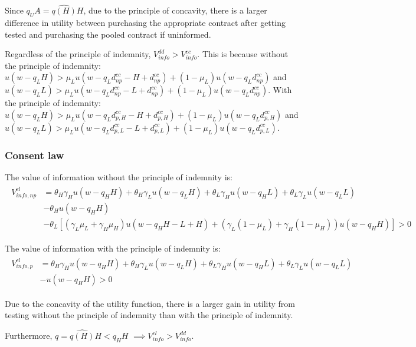 \documentclass[natbib=false,preprint,12pt]{elsarticle}
\theoremstyle{plain}
\theoremstyle{definition}
\theoremstyle{plain}
\theoremstyle{TheoremNum}
\theoremstyle{CorollaryNum}
\theoremstyle{PropositionNum}
\theoremstyle{TheoremNum}
\begin{document}
Since $q_U A = \widehat{q(H)}H$, due to the principle of concavity, there is a larger difference in utility between purchasing the appropriate contract after getting tested and purchasing the pooled contract if uninformed.

Regardless of the principle of indemnity, $V_{info}^{dd} > V_{info}^{cc}$. This is because without the principle of indemnity: $u(w-q_L H) > \mu_L u(w-q_L d_{np}^{cc} - H + d_{np}^{cc}) + (1-\mu_L)u(w-q_L d_{np}^{cc})$ and $u(w-q_L L) > \mu_L u(w-q_L d_{np}^{cc} - L + d_{np}^{cc}) + (1-\mu_L)u(w-q_L d_{np}^{cc})$. With the principle of indemnity: $u(w-q_L H) > \mu_L u(w-q_L d_{p,H}^{cc} - H + d_{p,H}^{cc}) + (1-\mu_L)u(w-q_L d_{p,H}^{cc})$ and $u(w-q_L L) > \mu_L u(w-q_L d_{p,L}^{cc} - L + d_{p,L}^{cc}) + (1-\mu_L)u(w-q_L d_{p,L}^{cc})$.

\subsubsection*{Consent law}


The value of information without the principle of indemnity is:
\begin{align}
\begin{split}
    V_{info,np}^{cl} & = \theta_H \gamma_H u(w-q_H H) + \theta_H \gamma_L u(w-q_L H) + \theta_L \gamma_H u(w-q_H L) + \theta_L \gamma_L u(w-q_L L) \\
    & - \theta_H u(w- q_H H) \\
    & - \theta_L [(\gamma_L\mu_L+\gamma_H \mu_H) u(w-q_H H - L + H) + (\gamma_L(1-\mu_L) + \gamma_H(1-\mu_H))u(w-q_H H)] > 0
\end{split}
\end{align}

The value of information with the principle of indemnity is:
\begin{align}
\begin{split}
    V_{info,p}^{cl} & = \theta_H \gamma_H u(w-q_H H) + \theta_H \gamma_L u(w-q_L H) + \theta_L \gamma_H u(w-q_H L) + \theta_L \gamma_L u(w-q_L L) \\
    & - u(w-q_H H) > 0
\end{split}
\end{align}

Due to the concavity of the utility function, there is a larger gain in utility from testing without the principle of indemnity than with the principle of indemnity. 

Furthermore, $q = \widehat{q(H)}H < q_H H$ $\implies V_{info}^{cl} > V_{info}^{dd}$.
\end{document}
